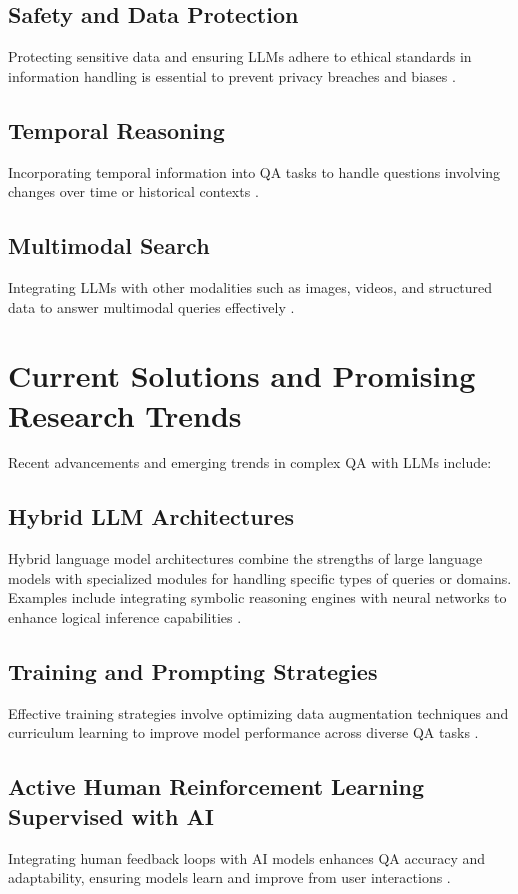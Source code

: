 \documentclass[10pt,a4paper]{article}
\begin{document}
\subsection{Safety and Data Protection}
Protecting sensitive data and ensuring LLMs adhere to ethical standards in information handling is essential to prevent privacy breaches and biases \cite{hajian2019adversarial, shah2021towards}.

\subsection{Temporal Reasoning}
Incorporating temporal information into QA tasks to handle questions involving changes over time or historical contexts \cite{radford2021learning}.

\subsection{Multimodal Search}
Integrating LLMs with other modalities such as images, videos, and structured data to answer multimodal queries effectively \cite{zhou2020unified}.

\section{Current Solutions and Promising Research Trends}
Recent advancements and emerging trends in complex QA with LLMs include:

\subsection{Hybrid LLM Architectures}
Hybrid language model architectures combine the strengths of large language models with specialized modules for handling specific types of queries or domains. Examples include integrating symbolic reasoning engines with neural networks to enhance logical inference capabilities \cite{ahn2021symbolic}.

\subsection{Training and Prompting Strategies}
Effective training strategies involve optimizing data augmentation techniques and curriculum learning to improve model performance across diverse QA tasks \cite{song2020learning}.

\subsection{Active Human Reinforcement Learning Supervised with AI}
Integrating human feedback loops with AI models enhances QA accuracy and adaptability, ensuring models learn and improve from user interactions \cite{yang2021active}.
\end{document}
